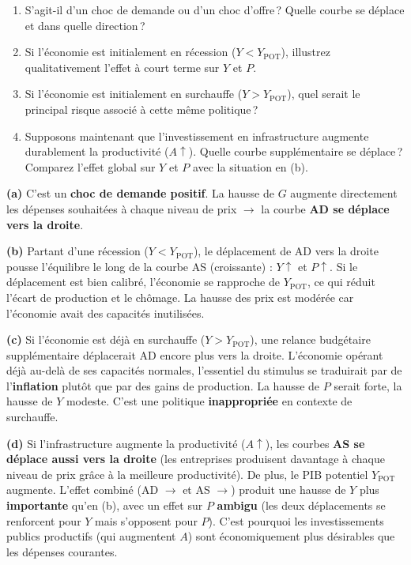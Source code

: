 
\begin{enumerate}[label=(\alph*)]
   \item S'agit-il d'un choc de demande ou d'un choc d'offre\,? Quelle courbe se déplace et dans quelle direction\,?
   \item Si l'économie est initialement en récession ($Y < Y_{\text{POT}}$), illustrez qualitativement l'effet à court terme sur $Y$ et $P$.
   \item Si l'économie est initialement en surchauffe ($Y > Y_{\text{POT}}$), quel serait le principal risque associé à cette même politique\,?
   \item Supposons maintenant que l'investissement en infrastructure augmente durablement la productivité ($A \uparrow$). Quelle courbe supplémentaire se déplace\,? Comparez l'effet global sur $Y$ et $P$ avec la situation en (b).
\end{enumerate}

\begin{reponse}
\textbf{(a)} C'est un \textbf{choc de demande positif}. La hausse de $G$ augmente directement les dépenses souhaitées à chaque niveau de prix $\to$ la courbe \textbf{AD se déplace vers la droite}.

\textbf{(b)} Partant d'une récession ($Y < Y_{\text{POT}}$), le déplacement de AD vers la droite pousse l'équilibre le long de la courbe AS (croissante) : $Y \uparrow$ et $P \uparrow$. Si le déplacement est bien calibré, l'économie se rapproche de $Y_{\text{POT}}$, ce qui réduit l'écart de production et le chômage. La hausse des prix est modérée car l'économie avait des capacités inutilisées.

\textbf{(c)} Si l'économie est déjà en surchauffe ($Y > Y_{\text{POT}}$), une relance budgétaire supplémentaire déplacerait AD encore plus vers la droite. L'économie opérant déjà au-delà de ses capacités normales, l'essentiel du stimulus se traduirait par de l'\textbf{inflation} plutôt que par des gains de production. La hausse de $P$ serait forte, la hausse de $Y$ modeste. C'est une politique \textbf{inappropriée} en contexte de surchauffe.

\textbf{(d)} Si l'infrastructure augmente la productivité ($A \uparrow$), les courbes \textbf{AS se déplace aussi vers la droite} (les entreprises produisent davantage à chaque niveau de prix grâce à la meilleure productivité). De plus, le PIB potentiel $Y_{\text{POT}}$ augmente. L'effet combiné (AD $\rightarrow$ et AS $\rightarrow$) produit une hausse de $Y$ plus \textbf{importante} qu'en (b), avec un effet sur $P$ \textbf{ambigu} (les deux déplacements se renforcent pour $Y$ mais s'opposent pour $P$). C'est pourquoi les investissements publics productifs (qui augmentent $A$) sont économiquement plus désirables que les dépenses courantes.
\end{reponse}

